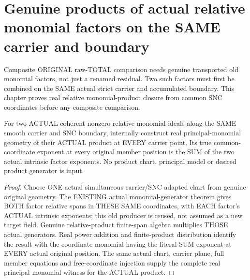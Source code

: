 \section{Genuine products of actual relative monomial factors on the SAME carrier and boundary}

Composite ORIGINAL raw-TOTAL comparison needs genuine transported old
monomial factors, not just a renamed residual. Two such factors must first
be combined on the SAME actual strict carrier and accumulated boundary.
This chapter proves real relative monomial-product closure from common
SNC coordinates before any composite comparison.

\begin{lemma}
\label{hir:sharp-actual-monomial-common-adapted-product-principal}
\leanok
For two ACTUAL coherent nonzero relative monomial ideals along the SAME
smooth carrier and SNC boundary, internally construct real
principal-monomial geometry of their ACTUAL product at EVERY carrier
point. Its true common-coordinate exponent at every original member
position is the SUM of the two actual intrinsic factor exponents. No
product chart, principal model or desired product generator is input.
\end{lemma}
\begin{proof}
Choose ONE actual simultaneous carrier/SNC adapted chart from genuine
original geometry. The EXISTING actual monomial-generator theorem gives
BOTH factor relative spans in THESE SAME coordinates, with EACH factor's
ACTUAL intrinsic exponents; this old producer is reused, not assumed as a
new target field. Genuine relative-product finite-span algebra multiplies
THOSE actual generators. Real power addition and finite-product distribution
identify the result with the coordinate monomial having the literal
SUM exponent at EVERY actual original position. The same actual chart,
carrier plane, full member equations and free-coordinate injection supply
the complete real principal-monomial witness for the ACTUAL product.
\end{proof}

